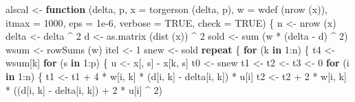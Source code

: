 \documentclass[
  12pt,
]{book}
\newenvironment{Shaded}{\begin{snugshade}}{\end{snugshade}}
\newcommand{\AttributeTok}[1]{\textcolor[rgb]{0.77,0.63,0.00}{#1}}
\newcommand{\ConstantTok}[1]{\textcolor[rgb]{0.00,0.00,0.00}{#1}}
\newcommand{\ControlFlowTok}[1]{\textcolor[rgb]{0.13,0.29,0.53}{\textbf{#1}}}
\newcommand{\DecValTok}[1]{\textcolor[rgb]{0.00,0.00,0.81}{#1}}
\newcommand{\FloatTok}[1]{\textcolor[rgb]{0.00,0.00,0.81}{#1}}
\newcommand{\FunctionTok}[1]{\textcolor[rgb]{0.00,0.00,0.00}{#1}}
\newcommand{\NormalTok}[1]{#1}
\newcommand{\OtherTok}[1]{\textcolor[rgb]{0.56,0.35,0.01}{#1}}
\newcommand{\SpecialCharTok}[1]{\textcolor[rgb]{0.00,0.00,0.00}{#1}}
\theoremstyle{definition}
\theoremstyle{definition}
\theoremstyle{definition}
\theoremstyle{definition}
\theoremstyle{remark}
\begin{document}
\begin{Shaded}
\begin{Highlighting}[]
\NormalTok{alscal }\OtherTok{\textless{}{-}}
  \ControlFlowTok{function}\NormalTok{ (delta,}
\NormalTok{            p,}
            \AttributeTok{x =} \FunctionTok{torgerson}\NormalTok{ (delta, p),}
            \AttributeTok{w =} \FunctionTok{wdef}\NormalTok{ (}\FunctionTok{nrow}\NormalTok{ (x)),}
            \AttributeTok{itmax =} \DecValTok{1000}\NormalTok{,}
            \AttributeTok{eps =} \FloatTok{1e{-}6}\NormalTok{,}
            \AttributeTok{verbose =} \ConstantTok{TRUE}\NormalTok{,}
            \AttributeTok{check =} \ConstantTok{TRUE}\NormalTok{) \{}
\NormalTok{    n }\OtherTok{\textless{}{-}} \FunctionTok{nrow}\NormalTok{ (x)}
\NormalTok{    delta }\OtherTok{\textless{}{-}}\NormalTok{ delta }\SpecialCharTok{\^{}} \DecValTok{2}
\NormalTok{    d }\OtherTok{\textless{}{-}} \FunctionTok{as.matrix}\NormalTok{ (}\FunctionTok{dist}\NormalTok{ (x)) }\SpecialCharTok{\^{}} \DecValTok{2}
\NormalTok{    sold }\OtherTok{\textless{}{-}} \FunctionTok{sum}\NormalTok{ (w }\SpecialCharTok{*}\NormalTok{ (delta }\SpecialCharTok{{-}}\NormalTok{ d) }\SpecialCharTok{\^{}} \DecValTok{2}\NormalTok{)}
\NormalTok{    wsum }\OtherTok{\textless{}{-}} \FunctionTok{rowSums}\NormalTok{ (w)}
\NormalTok{    itel }\OtherTok{\textless{}{-}} \DecValTok{1}
\NormalTok{    snew }\OtherTok{\textless{}{-}}\NormalTok{ sold}
    \ControlFlowTok{repeat}\NormalTok{ \{}
      \ControlFlowTok{for}\NormalTok{ (k }\ControlFlowTok{in} \DecValTok{1}\SpecialCharTok{:}\NormalTok{n) \{}
\NormalTok{        t4 }\OtherTok{\textless{}{-}}\NormalTok{ wsum[k]}
        \ControlFlowTok{for}\NormalTok{ (s }\ControlFlowTok{in} \DecValTok{1}\SpecialCharTok{:}\NormalTok{p) \{}
\NormalTok{          u }\OtherTok{\textless{}{-}}\NormalTok{ x[, s] }\SpecialCharTok{{-}}\NormalTok{ x[k, s]}
\NormalTok{          t0 }\OtherTok{\textless{}{-}}\NormalTok{ snew}
\NormalTok{          t1 }\OtherTok{\textless{}{-}}\NormalTok{ t2 }\OtherTok{\textless{}{-}}\NormalTok{ t3 }\OtherTok{\textless{}{-}} \DecValTok{0}
          \ControlFlowTok{for}\NormalTok{ (i }\ControlFlowTok{in} \DecValTok{1}\SpecialCharTok{:}\NormalTok{n) \{}
\NormalTok{            t1 }\OtherTok{\textless{}{-}}\NormalTok{ t1 }\SpecialCharTok{+} \DecValTok{4} \SpecialCharTok{*}\NormalTok{ w[i, k] }\SpecialCharTok{*}\NormalTok{ (d[i, k] }\SpecialCharTok{{-}}\NormalTok{ delta[i, k]) }\SpecialCharTok{*}\NormalTok{ u[i]}
\NormalTok{            t2 }\OtherTok{\textless{}{-}}
\NormalTok{              t2 }\SpecialCharTok{+} \DecValTok{2} \SpecialCharTok{*}\NormalTok{ w[i, k] }\SpecialCharTok{*}\NormalTok{ ((d[i, k] }\SpecialCharTok{{-}}\NormalTok{ delta[i, k]) }\SpecialCharTok{+} \DecValTok{2} \SpecialCharTok{*}\NormalTok{ u[i] }\SpecialCharTok{\^{}} \DecValTok{2}\NormalTok{)}

\end{Highlighting}
\end{Shaded}
\end{document}
